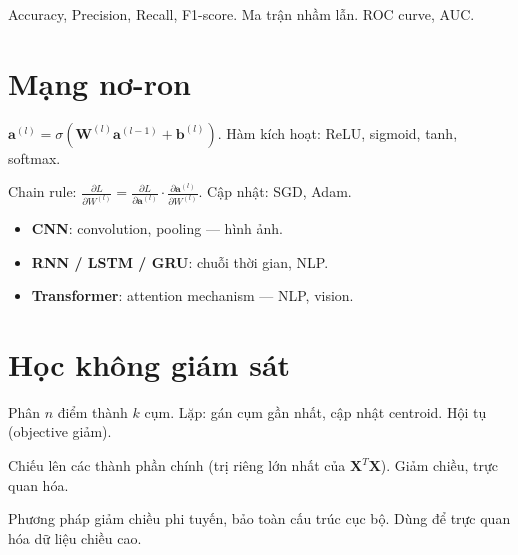 \documentclass[12pt,a4paper]{article}
\begin{document}
\begin{phuongphap}[title={Đánh giá phân loại}]
  Accuracy, Precision, Recall, F1-score. Ma trận nhầm lẫn. ROC curve, AUC.
\end{phuongphap}

\section{Mạng nơ-ron}

\begin{dinhnghia}[title={Perceptron nhiều lớp (MLP)}]
  $\mathbf{a}^{(l)} = \sigma(\mathbf{W}^{(l)}\mathbf{a}^{(l-1)} + \mathbf{b}^{(l)})$. Hàm kích hoạt: ReLU, sigmoid, tanh, softmax.
\end{dinhnghia}

\begin{phuongphap}[title={Backpropagation}]
  Chain rule: $\frac{\partial L}{\partial W^{(l)}} = \frac{\partial L}{\partial \mathbf{a}^{(l)}}\cdot\frac{\partial \mathbf{a}^{(l)}}{\partial W^{(l)}}$. Cập nhật: SGD, Adam.
\end{phuongphap}

\begin{tinhchat}[title={Kiến trúc phổ biến}]
  \begin{itemize}
    \item \textbf{CNN}: convolution, pooling --- hình ảnh.
    \item \textbf{RNN / LSTM / GRU}: chuỗi thời gian, NLP.
    \item \textbf{Transformer}: attention mechanism --- NLP, vision.
  \end{itemize}
\end{tinhchat}

\section{Học không giám sát}

\begin{phuongphap}[title={K-Means}]
  Phân $n$ điểm thành $k$ cụm. Lặp: gán cụm gần nhất, cập nhật centroid. Hội tụ (objective giảm).
\end{phuongphap}

\begin{phuongphap}[title={PCA}]
  Chiếu lên các thành phần chính (trị riêng lớn nhất của $\mathbf{X}^T\mathbf{X}$). Giảm chiều, trực quan hóa.
\end{phuongphap}

\begin{dinhnghia}[title={t-SNE, UMAP}]
  Phương pháp giảm chiều phi tuyến, bảo toàn cấu trúc cục bộ. Dùng để trực quan hóa dữ liệu chiều cao.
\end{dinhnghia}
\end{document}
